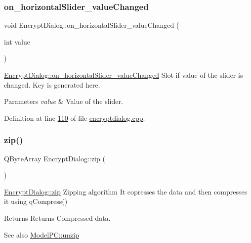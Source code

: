 \subsubsection{\texorpdfstring{on\+\_\+horizontal\+Slider\+\_\+value\+Changed}{on\_horizontalSlider\_valueChanged}}
{\footnotesize\ttfamily void Encrypt\+Dialog\+::on\+\_\+horizontal\+Slider\+\_\+value\+Changed (\begin{DoxyParamCaption}\item[{int}]{value }\end{DoxyParamCaption})\hspace{0.3cm}{\ttfamily [slot]}}



\mbox{\hyperlink{class_encrypt_dialog_a48c33063066fdbd61e2c87f08a5cfd60}{Encrypt\+Dialog\+::on\+\_\+horizontal\+Slider\+\_\+value\+Changed}} Slot if value of the slider is changed. Key is generated here. 


\begin{DoxyParams}{Parameters}
{\em value} & Value of the slider. \\
\hline
\end{DoxyParams}


Definition at line \mbox{\hyperlink{encryptdialog_8cpp_source_l00110}{110}} of file \mbox{\hyperlink{encryptdialog_8cpp_source}{encryptdialog.\+cpp}}.

\mbox{\label{class_encrypt_dialog_a2bff820a3df4ddc36ecb07ed74b7138a}} 
\subsubsection{\texorpdfstring{zip()}{zip()}}
{\footnotesize\ttfamily Q\+Byte\+Array Encrypt\+Dialog\+::zip (\begin{DoxyParamCaption}{ }\end{DoxyParamCaption})}



\mbox{\hyperlink{class_encrypt_dialog_a2bff820a3df4ddc36ecb07ed74b7138a}{Encrypt\+Dialog\+::zip}} Zipping algorithm It copresses the data and then compresses it using q\+Compress() 

\begin{DoxyReturn}{Returns}
Returns Compressed data. 
\end{DoxyReturn}
\begin{DoxySeeAlso}{See also}
\mbox{\hyperlink{class_model_p_c_a6da88f166785a49f73b22c169f956fd0}{Model\+P\+C\+::unzip}} 
\end{DoxySeeAlso}


